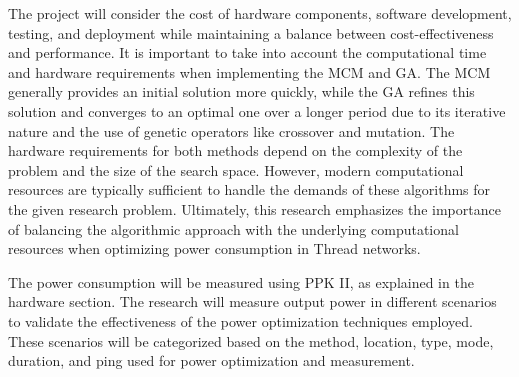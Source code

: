 The project will consider the cost of hardware components, software development, testing, and deployment while maintaining a balance between cost-effectiveness and performance. It is important to take into account the computational time and hardware requirements when implementing the \gls{MCM} and \gls{GA}. The \gls{MCM} generally provides an initial solution more quickly, while the \gls{GA} refines this solution and converges to an optimal one over a longer period due to its iterative nature and the use of genetic operators like crossover and mutation. The hardware requirements for both methods depend on the complexity of the problem and the size of the search space. However, modern computational resources are typically sufficient to handle the demands of these algorithms for the given research problem. Ultimately, this research emphasizes the importance of balancing the algorithmic approach with the underlying computational resources when optimizing power consumption in Thread networks.

The power consumption will be measured using \gls{PPK} II, as explained in the hardware section. The research will measure output power in different scenarios to validate the effectiveness of the power optimization techniques employed. These scenarios will be categorized based on the method, location, type, mode, duration, and ping used for power optimization and measurement.

